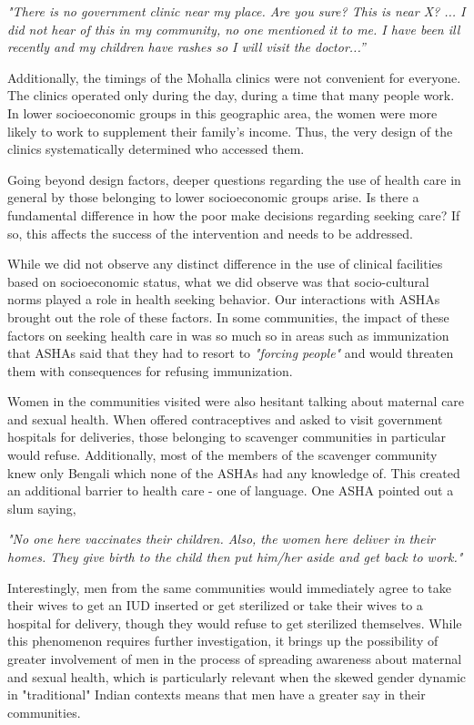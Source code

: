 \textit{"There is no government clinic near my place. Are you sure? This is near X? ... I did not hear of this in my community, no one mentioned it to me. I have been ill recently and my children have rashes so I will visit the doctor...”}

Additionally, the timings of the Mohalla clinics were not convenient for everyone. The clinics operated only during the day, during a time that many people work. In lower socioeconomic groups in this geographic area, the women were more likely to work to supplement their family's income. Thus, the very design of the clinics systematically determined who accessed them.

Going beyond design factors, deeper questions regarding the use of health care in general by those belonging to lower socioeconomic groups arise. Is there a fundamental difference in how the poor make decisions regarding seeking care? If so, this affects the success of the intervention and needs to be addressed.

While we did not observe any distinct difference in the use of clinical facilities based on socioeconomic status, what we did observe was that socio-cultural norms played a role in health seeking behavior. Our interactions with ASHAs brought out the role of these factors. In some communities, the impact of these factors on seeking health care in was so much so in areas such as immunization that ASHAs said that they had to resort to \textit{"forcing people"} and would threaten them with consequences for refusing immunization.

Women in the communities visited were also hesitant talking about maternal care and sexual health. When offered contraceptives and asked to visit government hospitals for deliveries, those belonging to scavenger communities in particular would refuse. Additionally, most of the members of the scavenger community knew only Bengali which none of the ASHAs had any knowledge of. This created an additional barrier to health care - one of language. One ASHA pointed out a slum saying,

\textit{"No one here vaccinates their children. Also, the women here deliver in their homes. They give birth to the child then put him/her aside and get back to work."} 

Interestingly, men from the same communities would immediately agree to take their wives to get an IUD inserted or get sterilized or take their wives to a hospital for delivery, though they would refuse to get sterilized themselves. While this phenomenon requires further investigation, it brings up the possibility of greater involvement of men in the process of spreading awareness about maternal and sexual health, which is particularly relevant when the skewed gender dynamic in "traditional" Indian contexts means that men have a greater say in their communities. %

